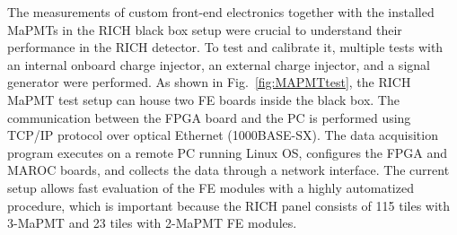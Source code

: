 The measurements of custom front-end electronics together with the installed MaPMTs in the RICH black box setup were crucial to understand their performance in the RICH detector.
To test and calibrate it, multiple tests with an internal onboard charge injector, an external charge injector, and a signal generator were performed.
As shown in Fig.~\ref{fig:MAPMTtest}, the RICH MaPMT test setup can house two FE boards inside the black box.
The communication between the FPGA board and the PC is performed using TCP/IP protocol over optical Ethernet (1000BASE-SX).
The data acquisition program executes on a remote PC running Linux OS, configures the FPGA and MAROC boards, and collects the data through a network interface.
The current setup allows fast evaluation of the FE modules with a highly automatized procedure, which is important because the RICH panel consists of 115 tiles with 3-MaPMT and 23 tiles with 2-MaPMT FE modules.
